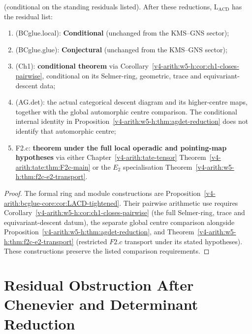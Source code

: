 \begin{corollary}
\label{v4-arith:w5-h:cor:LACD-wave5}
\ClaimStatusConjectured (conditional on the standing residuals listed).
After these reductions, \(\mathrm{L}_{\mathrm{ACD}}\) has the residual
list:
\begin{enumerate}
\item (BCglue.local): \textbf{Conditional} (unchanged from
the KMS--GNS sector);
\item (BCglue.glue): \textbf{Conjectural} (unchanged from the KMS--GNS sector);
\item (Ch1): \textbf{conditional theorem} via
Corollary~\ref{v4-arith:w5-h:cor:ch1-closes-pairwise}, conditional on its
Selmer-ring, geometric, trace and equivariant-descent data;
\item (AG.det): the actual categorical descent diagram and its
higher-centre maps, together with the global automorphic centre
comparison. The conditional internal identity in
Proposition~\ref{v4-arith:w5-h:thm:agdet-reduction} does not identify that
automorphic centre;
\item F2.c: \textbf{theorem under the full local operadic and
pointing-map hypotheses} via either
Chapter~\ref{v4-arith:tate-tensor}
Theorem~\ref{v4-arith:tate:thm:F2c-main} or the \(E_{2}\) specialisation
Theorem~\ref{v4-arith:w5-h:thm:f2c-e2-transport}.
\end{enumerate}
\end{corollary}

\begin{proof}
The formal ring and module constructions are
Proposition~\ref{v4-arith:bcglue-core:cor:LACD-tightened}.
Their pairwise arithmetic use requires
Corollary~\ref{v4-arith:w5-h:cor:ch1-closes-pairwise} (the full Selmer-ring, trace and equivariant-descent datum),
the separate global centre comparison alongside
Proposition~\ref{v4-arith:w5-h:thm:agdet-reduction}, and
Theorem~\ref{v4-arith:w5-h:thm:f2c-e2-transport} (restricted \(F2.c\)
transport under its stated hypotheses).
These constructions preserve the listed comparison requirements.
\end{proof}

\section{Residual Obstruction After Chenevier and Determinant Reduction}
\label{v4-arith:w5-h:residual-obstruction}

